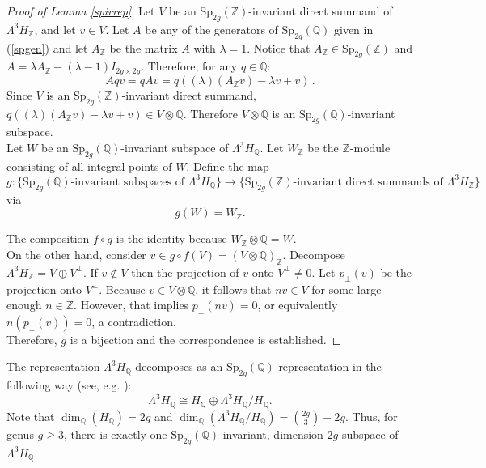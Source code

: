 \documentclass[a4paper]{amsproc}
\theoremstyle{TheoremNum}
\theoremstyle{Theorembold}
\theoremstyle{TheoremboldDef}
\theoremstyle{TheoremboldRem}
\theoremstyle{TheoremboldRem}
\begin{document}
\begin{proof}[Proof of Lemma \ref{spirrep}]
\vspace{.45cm}

Let $V$ be an ${\text{Sp}_{2g}({\mathbb{Z}})}$-invariant direct summand of $\Lambda^3H_{\mathbb{Z}}$, and let $v\in V$. Let $A$ be any of the generators of ${\text{Sp}_{2g}({\mathbb{Q}})}$ given in (\ref{spgen}) and let $A_{\mathbb{Z}}$ be the matrix $A$ with $\lambda=1$. Notice that $A_{\mathbb{Z}}\in{\text{Sp}_{2g}({\mathbb{Z}})}$ and $A=\lambda A_{\mathbb{Z}}-(\lambda-1)I_{2g\times 2g}$. Therefore, for any $q\in {\mathbb{Q}}$: \[Aqv=qAv=q((\lambda)(A_{\mathbb{Z}} v)-\lambda v+ v)\, .\] Since $V$ is an ${\text{Sp}_{2g}({\mathbb{Z}})}$-invariant direct summand, $q((\lambda)(A_{\mathbb{Z}} v)-\lambda v+ v) \in V\otimes {\mathbb{Q}}$.
Therefore $V\otimes {\mathbb{Q}}$ is an ${\text{Sp}_{2g}({\mathbb{Q}})}$-invariant subspace.\\

Let $W$ be an ${\text{Sp}_{2g}({\mathbb{Q}})}$-invariant subspace of $\Lambda^3H_{\mathbb{Q}}$. Let $W_{\mathbb{Z}}$ be the ${\mathbb{Z}}$-module consisting of all integral points of $W$. Define the map \[g:  \{{\text{Sp}_{2g}({\mathbb{Q}})} \text{-invariant subspaces of }\Lambda^3H_{\mathbb{Q}}\}\to \{{\text{Sp}_{2g}({\mathbb{Z}})}\text{-invariant direct summands of }\Lambda^3H_{\mathbb{Z}}\}\] via \[g(W)= W_{\mathbb{Z}}.\] 

 The composition $f\circ g$ is the identity because $W_{\mathbb{Z}}\otimes {\mathbb{Q}}=W$.\\
 
 On the other hand, consider $v\in g\circ f(V)=(V\otimes {\mathbb{Q}})_{\mathbb{Z}}$. Decompose $\Lambda^3H_{\mathbb{Z}}=V\oplus V^\perp$. If $v\notin V$ then the projection of $v$ onto $V^\perp\not=0$. Let $p_\perp(v)$ be the projection onto $V^\perp$. Because $v\in V\otimes{\mathbb{Q}}$, it follows that $nv\in V$ for some large enough $n\in{\mathbb{Z}}$. However, that implies $p_\perp(nv)=0$, or equivalently $n(p_\perp(v))=0$, a contradiction. \\

Therefore, $g$ is a bijection and the correspondence is established.
\end{proof}

The representation $\Lambda^3H_{\mathbb{Q}}$ decomposes as an ${\text{Sp}_{2g}({\mathbb{Q}})}$-representation  in the following way (see, e.g. \cite[Sect.3]{FarbSp}): \[\Lambda^3H_{\mathbb{Q}}\cong H_{\mathbb{Q}}\oplus\Lambda^3H_{\mathbb{Q}}/H_{\mathbb{Q}}.\]  Note that $\dim_{\mathbb{Q}} (H_{\mathbb{Q}})=2g$ and $\dim_{\mathbb{Q}}(\Lambda^3H_{\mathbb{Q}}/H_{\mathbb{Q}})=\binom{2g}{3}-2g$. 
Thus, for genus $g{\geqslant} 3$, there is exactly one ${\text{Sp}_{2g}({\mathbb{Q}})}$-invariant, dimension-$2g$ subspace of $\Lambda^3H_{\mathbb{Q}}$.\\
\end{document}
